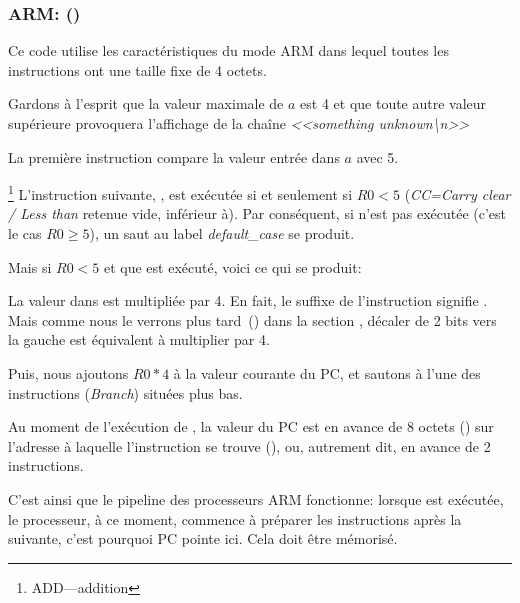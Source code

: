 \subsubsection{ARM: \OptimizingKeilVI (\ARMMode)}
\label{sec:SwitchARMLot}



Ce code utilise les caractéristiques du mode ARM dans lequel toutes les instructions
ont une taille fixe de 4 octets.

Gardons à l'esprit que la valeur maximale de $a$ est 4 et que toute autre valeur
supérieure provoquera l'affichage de la chaîne \emph{<<something unknown\textbackslash{}n>>}

La première instruction  compare la valeur entrée dans $a$ avec 5.

\footnote{ADD---addition}
L'instruction suivante, , est exécutée si et seulement
si $R0 < 5$ (\emph{CC=Carry clear / Less than} retenue vide, inférieur à).
Par conséquent, si  n'est pas exécutée (c'est le cas $R0 \geq 5$), un
saut au label \emph{default\_case} se produit.

Mais si $R0 < 5$ et que  est exécuté, voici ce qui se produit:

La valeur dans  est multipliée par 4.
En fait, le suffixe de l'instruction  signifie .
Mais comme nous le verrons plus tard~() dans la section
\q{\ShiftsSectionName}, décaler de 2 bits vers la gauche est équivalent à multiplier
par 4.

Puis, nous ajoutons $R0*4$ à la valeur courante du \ac{PC}, et sautons à l'une
des instructions  (\emph{Branch}) situées plus bas.

Au moment de l'exécution de , la valeur du \ac{PC} est en avance de 8
octets () sur l'adresse à laquelle l'instruction  se trouve
(), ou, autrement dit, en avance de 2 instructions.


C'est ainsi que le pipeline des processeurs ARM fonctionne: lorsque  est
exécutée, le processeur, à ce moment, commence à préparer les instructions après
la suivante, c'est pourquoi \ac{PC} pointe ici. Cela doit être mémorisé.

